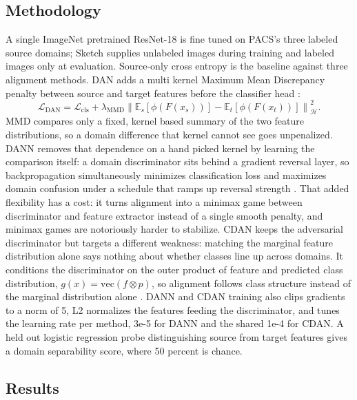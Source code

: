 \documentclass{article}
\begin{document}
\subsection{Methodology}

A single ImageNet pretrained ResNet-18 is fine tuned on PACS's
three labeled source domains; Sketch supplies unlabeled images during
training and labeled images only at evaluation. Source-only cross entropy
is the baseline against three alignment methods. DAN adds a multi kernel
Maximum Mean Discrepancy penalty between source and target features before
the classifier head \citep{long2015learning}:
\begin{equation}
  \mathcal{L}_{\text{DAN}} = \mathcal{L}_{\text{cls}} + \lambda_{\text{MMD}}
  \left\lVert \mathbb{E}_s[\phi(F(x_s))] - \mathbb{E}_t[\phi(F(x_t))] \right\rVert^2_{\mathcal{H}}.
  \label{eq:mmd}
\end{equation}
MMD compares only a fixed, kernel based summary of the two feature
distributions, so a domain difference that kernel cannot see goes
unpenalized. DANN removes that dependence on a hand picked kernel
by learning the comparison itself: a domain discriminator sits behind a
gradient reversal layer, so backpropagation simultaneously minimizes
classification loss and maximizes domain confusion under a schedule that
ramps up reversal strength \citep{ganin2016domainadversarial}. That added
flexibility has a cost: it turns alignment into a minimax game between
discriminator and feature extractor instead of a single smooth penalty,
and minimax games are notoriously harder to stabilize. CDAN keeps the
adversarial discriminator but targets a different weakness: matching
the marginal feature distribution alone says nothing about whether
classes line up across domains. It conditions the discriminator on the
outer product of feature and predicted class distribution,
$g(x)=\mathrm{vec}(f\otimes p)$, so alignment follows class structure
instead of the marginal distribution alone \citep{long2018conditional}.
DANN and CDAN training also clips gradients to a norm of 5, L2
normalizes the features feeding the discriminator, and tunes the
learning rate per method, 3e-5 for DANN and the shared 1e-4 for CDAN. A
held out logistic regression probe distinguishing source from target
features gives a domain separability score, where 50 percent is chance.

\subsection{Results}
\end{document}

